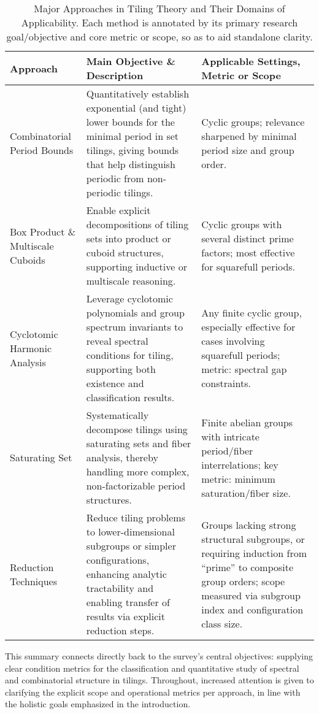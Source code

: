 \documentclass[sigconf]{acmart}
\begin{document}
\begin{table*}[htbp]
\centering
\caption{Major Approaches in Tiling Theory and Their Domains of Applicability. Each method is annotated by its primary research goal/objective and core metric or scope, so as to aid standalone clarity.}
\label{tab:advances}
\begin{adjustbox}{max width=\textwidth}
\begin{tabular}{lll}
\toprule
\textbf{Approach} & \textbf{Main Objective \& Description} & \textbf{Applicable Settings, Metric or Scope} \\
\midrule
Combinatorial Period Bounds & Quantitatively establish exponential (and tight) lower bounds for the minimal period in set tilings, giving bounds that help distinguish periodic from non-periodic tilings. & Cyclic groups; relevance sharpened by minimal period size and group order. \\
Box Product \& Multiscale Cuboids & Enable explicit decompositions of tiling sets into product or cuboid structures, supporting inductive or multiscale reasoning. & Cyclic groups with several distinct prime factors; most effective for squarefull periods. \\
Cyclotomic Harmonic Analysis & Leverage cyclotomic polynomials and group spectrum invariants to reveal spectral conditions for tiling, supporting both existence and classification results. & Any finite cyclic group, especially effective for cases involving squarefull periods; metric: spectral gap constraints. \\
Saturating Set & Systematically decompose tilings using saturating sets and fiber analysis, thereby handling more complex, non-factorizable period structures. & Finite abelian groups with intricate period/fiber interrelations; key metric: minimum saturation/fiber size.\\
Reduction Techniques & Reduce tiling problems to lower-dimensional subgroups or simpler configurations, enhancing analytic tractability and enabling transfer of results via explicit reduction steps. & Groups lacking strong structural subgroups, or requiring induction from “prime” to composite group orders; scope measured via subgroup index and configuration class size. \\
\bottomrule
\end{tabular}
\end{adjustbox}
\end{table*}

\noindent
This summary connects directly back to the survey's central objectives: supplying clear condition metrics for the classification and quantitative study of spectral and combinatorial structure in tilings. Throughout, increased attention is given to clarifying the explicit scope and operational metrics per approach, in line with the holistic goals emphasized in the introduction.
\end{document}
